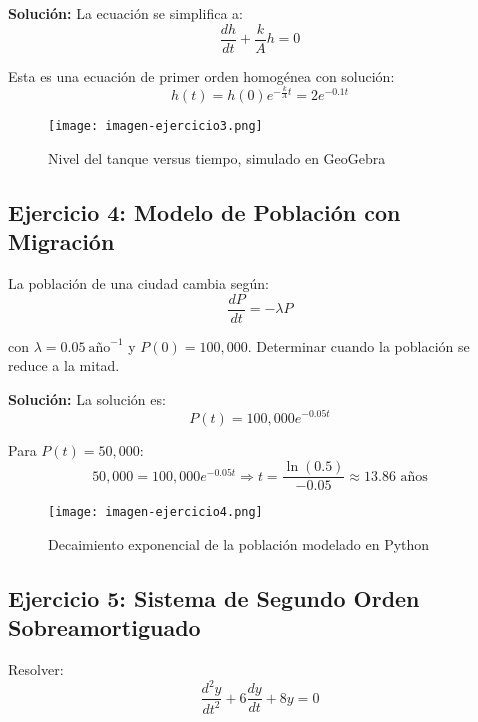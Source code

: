 \textbf{Solución:}
La ecuación se simplifica a:
\begin{equation}
    \frac{dh}{dt} + \frac{k}{A} h = 0
\end{equation}

Esta es una ecuación de primer orden homogénea con solución:
\begin{equation}
    h(t) = h(0) e^{-\frac{k}{A}t} = 2 e^{-0.1t}
\end{equation}

\begin{figure}[H]
    \centering
    \texttt{[image: imagen-ejercicio3.png]}
    \caption{Nivel del tanque versus tiempo, simulado en GeoGebra}
\end{figure}

\subsection{Ejercicio 4: Modelo de Población con Migración}

La población de una ciudad cambia según:
\begin{equation}
    \frac{dP}{dt} = -\lambda P
\end{equation}

con $\lambda = 0.05\ \text{año}^{-1}$ y $P(0) = 100,000$. Determinar cuando la población se reduce a la mitad.

\textbf{Solución:}
La solución es:
\begin{equation}
    P(t) = 100,000 e^{-0.05t}
\end{equation}

Para $P(t) = 50,000$:
\begin{equation}
    50,000 = 100,000 e^{-0.05t} \Rightarrow t = \frac{\ln(0.5)}{-0.05} \approx 13.86 \text{ años}
\end{equation}

\begin{figure}[H]
    \centering
    \texttt{[image: imagen-ejercicio4.png]}
    \caption{Decaimiento exponencial de la población modelado en Python}
\end{figure}

\subsection{Ejercicio 5: Sistema de Segundo Orden Sobreamortiguado}

Resolver:
\begin{equation}
    \frac{d^2 y}{dt^2} + 6 \frac{dy}{dt} + 8y = 0
\end{equation}

